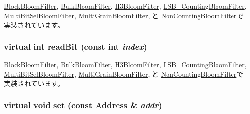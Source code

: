 \hyperlink{classBlockBloomFilter_ac55fe386a101fbae38c716067c9966a0}{BlockBloomFilter}, \hyperlink{classBulkBloomFilter_ac55fe386a101fbae38c716067c9966a0}{BulkBloomFilter}, \hyperlink{classH3BloomFilter_ac55fe386a101fbae38c716067c9966a0}{H3BloomFilter}, \hyperlink{classLSB__CountingBloomFilter_ac55fe386a101fbae38c716067c9966a0}{LSB\_\-CountingBloomFilter}, \hyperlink{classMultiBitSelBloomFilter_ac55fe386a101fbae38c716067c9966a0}{MultiBitSelBloomFilter}, \hyperlink{classMultiGrainBloomFilter_ac55fe386a101fbae38c716067c9966a0}{MultiGrainBloomFilter}, と \hyperlink{classNonCountingBloomFilter_ac55fe386a101fbae38c716067c9966a0}{NonCountingBloomFilter}で実装されています。\hypertarget{classAbstractBloomFilter_a6c0e9a098f0f210aa42eb2f1553804eb}{
\subsubsection[{readBit}]{\setlength{\rightskip}{0pt plus 5cm}virtual int readBit (const int {\em index})}}
\label{classAbstractBloomFilter_a6c0e9a098f0f210aa42eb2f1553804eb}


\hyperlink{classBlockBloomFilter_a6f8a98d0f38a8d122d4cbf87323484eb}{BlockBloomFilter}, \hyperlink{classBulkBloomFilter_a6f8a98d0f38a8d122d4cbf87323484eb}{BulkBloomFilter}, \hyperlink{classH3BloomFilter_a6f8a98d0f38a8d122d4cbf87323484eb}{H3BloomFilter}, \hyperlink{classLSB__CountingBloomFilter_a6f8a98d0f38a8d122d4cbf87323484eb}{LSB\_\-CountingBloomFilter}, \hyperlink{classMultiBitSelBloomFilter_a6f8a98d0f38a8d122d4cbf87323484eb}{MultiBitSelBloomFilter}, \hyperlink{classMultiGrainBloomFilter_a6f8a98d0f38a8d122d4cbf87323484eb}{MultiGrainBloomFilter}, と \hyperlink{classNonCountingBloomFilter_a6f8a98d0f38a8d122d4cbf87323484eb}{NonCountingBloomFilter}で実装されています。\hypertarget{classAbstractBloomFilter_a54e1262ae5f60efeb8714d0556b3c32e}{
\subsubsection[{set}]{\setlength{\rightskip}{0pt plus 5cm}virtual void set (const {\bf Address} \& {\em addr})}}
\label{classAbstractBloomFilter_a54e1262ae5f60efeb8714d0556b3c32e}


